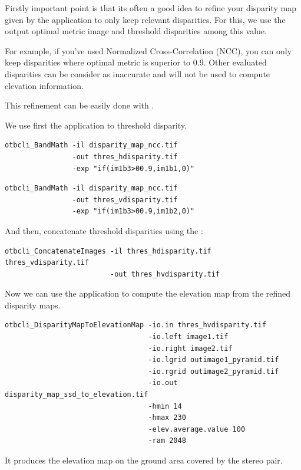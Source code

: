 Firstly important point is that its often a good idea to refine your disparity
map given by the  application to only keep relevant
disparities. For this, we use the output optimal metric image and threshold
disparities among this value.

For example, if you've used Normalized Cross-Correlation (NCC), you can only
keep disparities where optimal metric is superior to $0.9$. Other evaluated
disparities can be consider as inaccurate and will not be used to compute
elevation information.

This refinement can be easily done with \app.

We use first the  application to threshold disparity.

\begin{verbatim}
otbcli_BandMath -il disparity_map_ncc.tif
                -out thres_hdisparity.tif
                -exp "if(im1b3>00.9,im1b1,0)"
\end{verbatim}

\begin{verbatim}
otbcli_BandMath -il disparity_map_ncc.tif
                -out thres_vdisparity.tif
                -exp "if(im1b3>00.9,im1b2,0)"
\end{verbatim}

And then, concatenate threshold disparities using the :

\begin{verbatim}
otbcli_ConcatenateImages -il thres_hdisparity.tif  thres_vdisparity.tif
                         -out thres_hvdisparity.tif
\end{verbatim}

Now we can use the  application to
compute the elevation map from the refined disparity maps.

\begin{verbatim}
otbcli_DisparityMapToElevationMap -io.in thres_hvdisparity.tif
                                  -io.left image1.tif
                                  -io.right image2.tif
                                  -io.lgrid outimage1_pyramid.tif
                                  -io.rgrid outimage2_pyramid.tif
                                  -io.out disparity_map_ssd_to_elevation.tif
                                  -hmin 14
                                  -hmax 230
                                  -elev.average.value 100
                                  -ram 2048
\end{verbatim}

It produces the elevation map on the ground area covered by the stereo pair.
